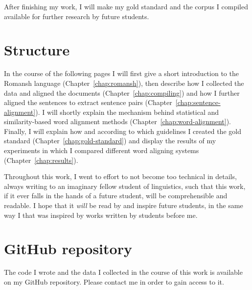 After finishing my work, I will make my gold standard and the corpus I compiled available for further research by future students.

\section{Structure}
In the course of the following pages I will first give a short introduction to the Romansh language (Chapter~\ref{chap:romansh}), then describe how I collected the data and aligned the documents (Chapter~\ref{chap:compiling}) and how I further aligned the sentences to extract sentence pairs (Chapter~\ref{chap:sentence-alignment}). 
I will shortly explain the mechanism behind statistical and similarity-based word alignment methods (Chapter~\ref{chap:word-alignment}). 
Finally, I will explain how and according to which guidelines I created the gold standard (Chapter~\ref{chap:gold-standard}) and display the results of my experiments in which I compared different word aligning systems (Chapter~\ref{chap:results}).

Throughout this work, I went to effort to not become too technical in details, always writing to an imaginary fellow  student of linguistics, such that this work, if it ever falls in the hands of a future student, will be comprehensible and readable. 
I hope that it \emph{will} be read by and inspire future students, in the same way I that was inspired by works written by students before me.

\section{GitHub repository}
The code I wrote and the data I collected in the course of this work is available on my GitHub repository. 
Please contact me in order to gain access to it.


